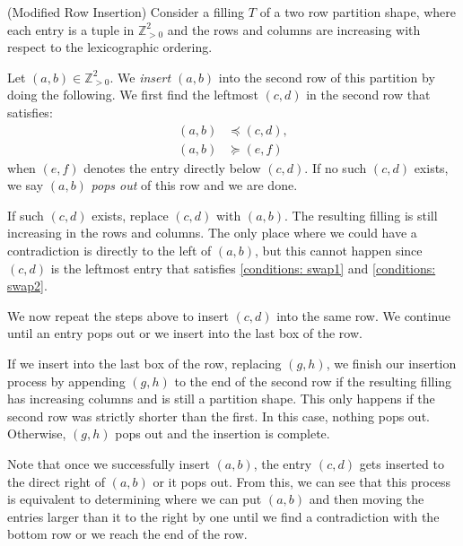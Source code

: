 \begin{alg}\label{alg: insertion} (Modified Row Insertion)
Consider a filling $T$ of a two row partition shape, where each entry is a tuple in $\mathbb{Z}^2_{>0}$ and the rows and columns are increasing with respect to the lexicographic ordering. 

Let $(a,b) \in \mathbb{Z}^2_{>0}$. We \textit{insert $(a,b)$} into the second row of this partition by doing the following.
We first find the leftmost $(c,d)$ in the second row that satisfies:
\begin{align}
        (a,b) & \preceq (c,d) \label{conditions: swap1},\\ (a,b) & \succeq (e,f)\label{conditions: swap2}
\end{align}
when $(e,f)$ denotes the entry directly below $(c,d)$.
If no such $(c,d)$ exists, we say $(a,b)$ \textit{pops out} of this row and we are done. 

If such $(c,d)$ exists, replace $(c,d)$ with $(a,b)$. The resulting filling is still increasing in the rows and columns. 
The only place where we could have a contradiction is directly to the left of $(a,b)$, but this cannot happen since $(c,d)$ is the leftmost entry that satisfies \eqref{conditions: swap1} and \eqref{conditions: swap2}.

We now repeat the steps above to insert $(c,d)$ into the same row. We continue until an entry pops out or we insert into the last box of the row. 

If we insert into the last box of the row, replacing $(g,h)$, we finish our insertion process by appending $(g,h)$ to the end of the second row if the resulting filling has increasing columns and is still a partition shape. This only happens if the second row was strictly shorter than the first. In this case, nothing pops out.
Otherwise, $(g,h)$ pops out and the insertion is complete. 

Note that once we successfully insert $(a,b)$, the entry $(c,d)$ gets inserted to the direct right of $(a,b)$ or it pops out. 
From this, we can see that this process is equivalent to determining where we can put $(a,b)$ and then moving the entries larger than it to the right by one until we find a contradiction with the bottom row or we reach the end of the row. 
\end{alg}

